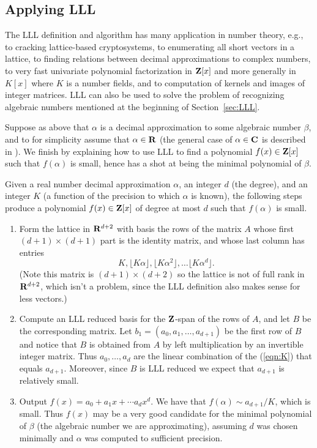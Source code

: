 \subsection{Applying LLL}
The LLL definition and algorithm has many application in 
number theory, e.g., to cracking lattice-based cryptosystems,
to enumerating all short vectors in a lattice, to finding relations
between decimal approximations to complex numbers, to very
fast univariate polynomial factorization in $\mathbf{Z}[x]$ and more
generally in $K[x]$ where $K$ is a number fields, and to
computation of kernels and images of integer matrices.  LLL
can also be used to solve the problem of recognizing algebraic
numbers mentioned at the beginning of Section~\ref{sec:LLL}.

Suppose as above that $\alpha$ is a decimal approximation
to some algebraic number $\beta$, and to for simplicity
assume that $\alpha\in\mathbf{R}$ (the general case of $\alpha \in \mathbf{C}$
is described in \cite{cohen:algs}). 
We finish by explaining how to use LLL to find a polynomial 
$f(x) \in \mathbf{Z}[x]$ such that $f(\alpha)$ is small, hence
has a shot at being the minimal polynomial of $\beta$. 

Given a real number decimal approximation $\alpha$, an
integer $d$ (the degree), and an integer $K$ (a function
of the precision to which $\alpha$ is known), the following
steps produce a polynomial $f(x) \in \mathbf{Z}[x]$ of degree 
at most $d$ such that $f(\alpha)$ is small.  
\begin{enumerate}
\item Form the lattice in $\mathbf{R}^{d+2}$ with basis the rows
of the matrix $A$ whose first $(d+1) \times (d+1)$ part is the
identity matrix, and whose last column has entries
\begin{equation}\label{eqn:K}
K, \lfloor K\alpha \rfloor, \lfloor K\alpha^2 \rfloor, 
\ldots \lfloor K\alpha^{d} \rfloor.
\end{equation}
(Note this matrix is $(d+1) \times (d+2)$ so the lattice
is not of full rank in $\mathbf{R}^{d+2}$, which isn't a problem,
since the LLL definition also makes sense for less vectors.)
\item Compute an LLL reduced basis for the $\mathbf{Z}$-span of the rows
of $A$, and let $B$ be the corresponding matrix. 
Let $b_1 = (a_0, a_1, \ldots, a_{d+1})$ be the first
row of $B$ and notice that $B$ is obtained from $A$
by left multiplication by an invertible integer matrix.
Thus $a_0,\ldots, a_d$ are the linear combination of the
(\ref{eqn:K}) that equals $a_{d+1}$. Moreover, since $B$
is LLL reduced we expect that $a_{d+1}$ is relatively small. 

\item Output $f(x) = a_0 + a_1 x + \cdots a_{d} x^d$.
We have that $f(\alpha) \sim a_{d+1}/K$, which is small.
Thus $f(x)$ may be a very good candidate for the minimal
polynomial of $\beta$ (the algebraic number we are approximating),
assuming $d$ was chosen minimally and $\alpha$ was computed
to sufficient precision.
\end{enumerate}

